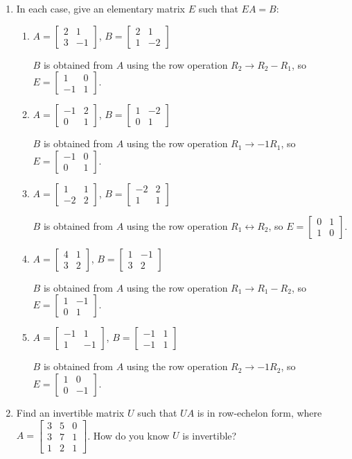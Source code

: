 \documentclass[12pt]{article}
\newcommand{\bbm}{\begin{bmatrix}}
\newcommand{\ebm}{\end{bmatrix}}
\begin{document}
\thispagestyle{fancy}

 \begin{enumerate}
 \item In each case, give an elementary matrix $E$ such that $EA=B$:
\begin{enumerate}
 \item $A=\bbm 2&1\\3&-1\ebm$, $B = \bbm 2&1\\1&-2\ebm$

$B$ is obtained from $A$ using the row operation $R_2\to R_2-R_1$, so $E = \bbm 1&0\\-1&1\ebm$.

 \item $A=\bbm -1&2\\0&1\ebm$, $B = \bbm 1&-2\\0&1\ebm$

$B$ is obtained from $A$ using the row operation $R_1\to -1R_1$, so $E=\bbm -1&0\\0&1\ebm$.

 \item $A=\bbm 1&1\\-2&2\ebm$, $B = \bbm -2&2\\1&1\ebm$

$B$ is obtained from $A$ using the row operation $R_1\leftrightarrow R_2$, so $E = \bbm 0&1\\1&0\ebm$.

 \item $A=\bbm 4&1\\3&2\ebm$, $B = \bbm 1&-1\\ 3&2\ebm$

$B$ is obtained from $A$ using the row operation $R_1\to R_1-R_2$, so $E = \bbm 1&-1\\0&1\ebm$.

 \item $A=\bbm -1&1\\1&-1\ebm$, $B=\bbm -1&1\\-1&1\ebm$

$B$ is obtained from $A$ using the row operation $R_2\to -1R_2$, so $E = \bbm 1&0\\0&-1\ebm$.
\end{enumerate}
 
\item Find an invertible matrix $U$ such that $UA$ is in row-echelon form, where $A = \bbm 3&5&0\\3&7&1\\1&2&1\ebm$. How do you know $U$ is invertible?


\end{enumerate}
\end{document}
